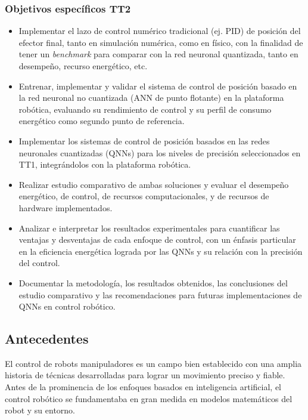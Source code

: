 \documentclass[12pt]{article}
\begin{document}
\subsubsection{Objetivos específicos TT2}
 
\begin{itemize}
    \item  Implementar el lazo de control numérico tradicional (ej. PID) de posición del efector final, tanto en simulación numérica, como en físico, con la finalidad de tener un \textit{benchmark} para comparar con la red neuronal quantizada, tanto en desempeño, recurso energético, etc.
    \item Entrenar, implementar y validar el sistema de control de posición basado en la red neuronal no cuantizada (ANN de punto flotante) en la plataforma robótica, evaluando su rendimiento de control y su perfil de consumo energético como segundo punto de referencia.
    \item Implementar los sistemas de control de posición basados en las redes neuronales cuantizadas (QNNs) para los niveles de precisión seleccionados en TT1, integrándolos con la plataforma robótica.
    \item Realizar estudio comparativo de ambas soluciones y evaluar el desempeño energético, de control, de recursos computacionales, y de recursos de hardware implementados.
    \item Analizar e interpretar los resultados experimentales para cuantificar las ventajas y desventajas de cada enfoque de control, con un énfasis particular en la eficiencia energética lograda por las QNNs y su relación con la precisión del control.
    \item Documentar la metodología, los resultados obtenidos, las conclusiones del estudio comparativo y las recomendaciones para futuras implementaciones de QNNs en control robótico. 
\end{itemize}

\subsection*{Antecedentes}
El control de robots manipuladores es un campo bien establecido con una amplia historia de técnicas desarrolladas para lograr un movimiento preciso y fiable. Antes de la prominencia de los enfoques basados en inteligencia artificial, el control robótico se fundamentaba en gran medida en modelos matemáticos del robot y su entorno.
\end{document}
